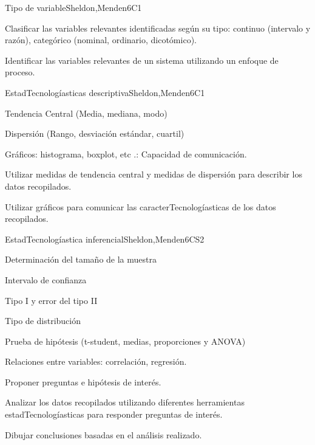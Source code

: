 \begin{syllabus}
\begin{unit}{Tipo de variable}{}{Sheldon,Menden}{6}{C1}
   \begin{learningoutcomes}
      \item Clasificar las variables relevantes identificadas según su tipo: continuo (intervalo y razón), categórico (nominal, ordinario, dicotómico).
      \item Identificar las variables relevantes de un sistema utilizando un enfoque de proceso.
   \end{learningoutcomes}
\end{unit}

\begin{unit}{EstadTecnologíasticas descriptiva}{}{Sheldon,Menden}{6}{C1}
\begin{topics}
      \item Tendencia Central (Media, mediana, modo)
      \item Dispersión (Rango, desviación estándar, cuartil)
      \item Gráficos: histograma, boxplot, etc .: Capacidad de comunicación.
   \end{topics}
   \begin{learningoutcomes}
      \item Utilizar medidas de tendencia central y medidas de dispersión para describir los datos recopilados.
      \item Utilizar gráficos para comunicar las caracterTecnologíasticas de los datos recopilados.
   \end{learningoutcomes}
\end{unit}

\begin{unit}{EstadTecnologíastica inferencial}{}{Sheldon,Menden}{6}{CS2}
\begin{topics}
      \item Determinación del tamaño de la muestra
      \item Intervalo de confianza
      \item Tipo I y error del tipo II
      \item Tipo de distribución
      \item Prueba de hipótesis (t-student, medias, proporciones y ANOVA)
      \item Relaciones entre variables: correlación, regresión.
   \end{topics}

   \begin{learningoutcomes}
      \item Proponer preguntas e hipótesis de interés.
      \item Analizar los datos recopilados utilizando diferentes herramientas estadTecnologíasticas para responder preguntas de interés.
      \item Dibujar conclusiones basadas en el análisis realizado.
   \end{learningoutcomes}
\end{unit}





\begin{coursebibliography}
\end{coursebibliography}

\end{syllabus}
